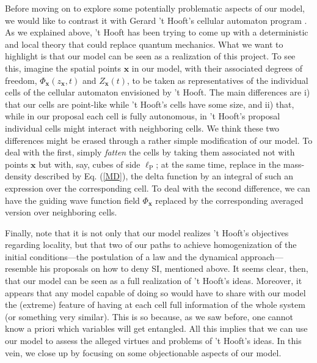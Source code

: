 \documentclass[letterpaper,12pt]{article}
\begin{document}
Before moving on to explore some potentially problematic aspects of our model, we would like to contrast it with Gerard 't Hooft's cellular automaton program \cite{Hooft2016}. As we explained above, 't Hooft has been trying to come up with a deterministic and local theory that could replace quantum mechanics. What we want to highlight is that our model can be seen as a realization of this project. To see this, imagine the spatial points $\mathbf{x}$ in our model, with their associated degrees of freedom, $\Phi_\mathbf{x}(z_{\mathbf{x}},t)$ and $Z_\mathbf{x}(t)$, to be taken as representatives of the individual cells of the cellular automaton envisioned by 't Hooft. The main differences are i) that our cells are point-like while 't Hooft's cells have some size, and ii) that, while in our proposal each cell is fully autonomous, in 't Hooft's proposal individual cells might interact with neighboring cells. We think these two differences might be erased through a rather simple modification of our model. To deal with the first, simply {\it fatten} the cells by taking them associated not with points $\mathbf{x}$ but with, say, cubes of side $\ell_{\text{P}}$; at the same time, replace in the mass-density described by Eq. (\ref{MD}), the delta function by an integral of such an expression over the corresponding cell. To deal with the second difference, we can have the guiding wave function field $\Phi_\mathbf{x}$ replaced by the corresponding averaged version over neighboring cells.

Finally, note that it is not only that our model realizes 't Hooft's objectives regarding locality, but that two of our paths to achieve homogenization of the initial conditions---the postulation of a law and the dynamical approach---resemble his proposals on how to deny SI, mentioned above. It seems clear, then, that our model can be seen as a full realization of 't Hooft's ideas. Moreover, it appears that any model capable of doing so would have to share with our model the (extreme) feature of having at each cell full information of the whole system (or something very similar). This is so because, as we saw before, one cannot know a priori which variables will get entangled. All this implies that we can use our model to assess the alleged virtues and problems of 't Hooft's ideas. In this vein, we close up by focusing on some objectionable aspects of our model.
\end{document}
